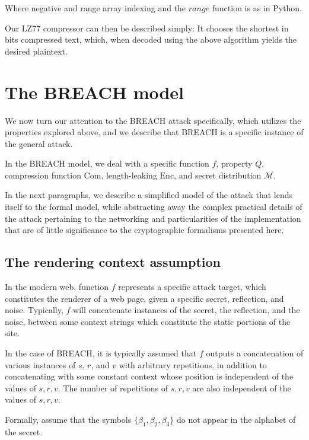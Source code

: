 \documentclass[conference, letterpaper, 10pt]{IEEEtran}
\begin{document}
Where negative and range array indexing and the $range$ function is as in
Python.

Our LZ77 compressor can then be described simply: It chooses the shortest in
bits compressed text, which, when decoded using the above algorithm yields the
desired plaintext.


\section{The BREACH model}\label{sec:breachmodel}
We now turn our attention to the BREACH attack specifically, which utilizes
the properties explored above, and we describe that BREACH is a specific
instance of the general attack.

In the BREACH model, we deal with a specific function $f$, property $Q$,
compression function $\textrm{Com}$, length-leaking $\textrm{Enc}$, and secret distribution
$\mathcal{M}$.

In the next paragraphs, we describe a simplified model of the attack that
lends itself to the formal model, while abstracting away the complex
practical details of the attack pertaining to the networking and particularities
of the implementation that are of little significance to the cryptographic
formalisms presented here.

\subsection{The rendering context assumption}\label{subsec:rendering}

In the modern web, function $f$ represents a specific attack target, which
constitutes the renderer of a web page, given a specific secret, reflection,
and noise. Typically, $f$ will concatenate instances of the secret, the
reflection, and the noise, between some context strings which constitute the
static portions of the site.

In the case of BREACH, it is typically assumed that $f$ outputs a concatenation
of various instances of $s$, $r$, and $v$ with arbitrary repetitions, in
addition to concatenating with some constant context whose position is
independent of the values of $s, r, v$. The number of repetitions of $s, r, v$
are also independent of the values of $s, r, v$.

Formally, assume that the symbols $\{\beta_1, \beta_2, \beta_3\}$ do not appear
in the alphabet of the secret.
\end{document}
